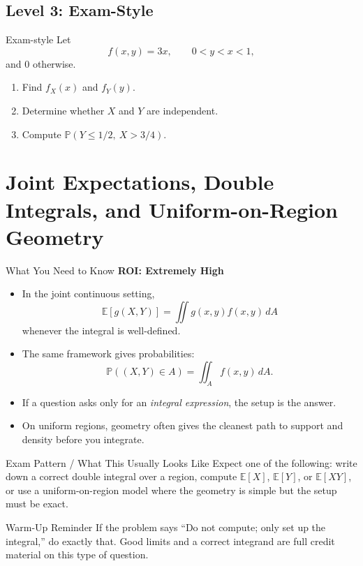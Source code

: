 \documentclass[12pt]{article}
\newcommand{\EE}{\mathbb{E}}
\newcommand{\PP}{\mathbb{P}}
\newcommand{\writespace}[1]{\vspace*{#1}}
\newcommand{\xlongws}{\writespace{4.1cm}}
\newcommand{\roiline}[1]{\textbf{ROI: #1}}
\newcounter{problem}[section]
\begin{document}
\subsection*{Level 3: Exam-Style}

\begin{practiceproblem}{Exam-style}
Let
\[
  f(x,y)=3x,\qquad 0<y<x<1,
\]
and $0$ otherwise.
\begin{enumerate}
  \item Find $f_X(x)$ and $f_Y(y)$.
  \item Determine whether $X$ and $Y$ are independent.
  \item Compute $\PP(Y\le 1/2,\ X>3/4)$.
\end{enumerate}
\end{practiceproblem}
\xlongws

\clearpage

\section{Joint Expectations, Double Integrals, and Uniform-on-Region Geometry}

\begin{summarybox}{What You Need to Know}
\roiline{Extremely High}
\begin{itemize}
  \item In the joint continuous setting,
  \[
    \EE[g(X,Y)]=\iint g(x,y)f(x,y)\,dA
  \]
  whenever the integral is well-defined.
  \item The same framework gives probabilities:
  \[
    \PP((X,Y)\in A)=\iint_A f(x,y)\,dA.
  \]
  \item If a question asks only for an \emph{integral expression}, the setup is the answer.
  \item On uniform regions, geometry often gives the cleanest path to support and density before you integrate.
\end{itemize}
\end{summarybox}

\begin{patternbox}{Exam Pattern / What This Usually Looks Like}
Expect one of the following: write down a correct double integral over a region, compute $\EE[X]$, $\EE[Y]$, or $\EE[XY]$, or use a uniform-on-region model where the geometry is simple but the setup must be exact.
\end{patternbox}

\begin{examplebox}{Warm-Up Reminder}
If the problem says ``Do not compute; only set up the integral,'' do exactly that. Good limits and a correct integrand are full credit material on this type of question.
\end{examplebox}
\end{document}

